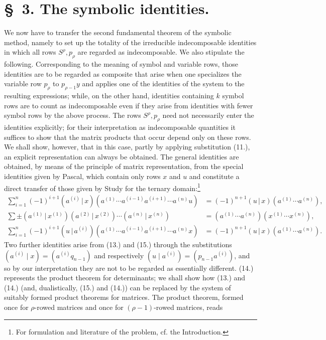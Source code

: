 \documentclass[11pt]{article}
\newcommand{\pair}[2]{(#1\,|\,#2)}
\begin{document}
\section*{\S\ 3. The symbolic identities.}
We now have to transfer the second fundamental theorem of the symbolic method, namely to set up the totality of the irreducible indecomposable identities in which all rows $S^\rho,p_\rho$ are regarded as indecomposable. We also stipulate the following. Corresponding to the meaning of symbol and variable rows, those identities are to be regarded as composite that arise when one specializes the variable row $p_\rho$ to $p_{\rho-1}y$ and applies one of the identities of the system to the resulting expressions; while, on the other hand, identities containing $k$ symbol rows are to count as indecomposable even if they arise from identities with fewer symbol rows by the above process. The rows $S^\rho,p_\rho$ need not necessarily enter the identities explicitly; for their interpretation as indecomposable quantities it suffices to show that the matrix products that occur depend only on these rows. We shall show, however, that in this case, partly by applying substitution (11.), an explicit representation can always be obtained. The general identities are obtained, by means of the principle of matrix representation, from the special identities given by Pascal, which contain only rows $x$ and $u$ and constitute a direct transfer of those given by Study for the ternary domain:\footnote{For formulation and literature of the problem, cf. the Introduction.}
\begin{align}
\sum_{i=1}^n(-1)^{i+1}\pair{a^{(i)}}{x}(a^{(1)}\cdots a^{(i-1)}a^{(i+1)}\cdots a^{(n)}u)&=(-1)^{n+1}\pair{u}{x}(a^{(1)}\cdots a^{(n)}),\tag{13}\\
\sum\pm\pair{a^{(1)}}{x^{(1)}}\pair{a^{(2)}}{x^{(2)}}\cdots\pair{a^{(n)}}{x^{(n)}}&=(a^{(1)}\cdots a^{(n)})(x^{(1)}\cdots x^{(n)}),\tag{14}\\
\sum_{i=1}^n(-1)^{i+1}\pair{u}{a^{(i)}}(a^{(1)}\cdots a^{(i-1)}a^{(i+1)}\cdots a^{(n)}x)&=(-1)^{n+1}\pair{u}{x}(a^{(1)}\cdots a^{(n)}).\tag{15}
\end{align}
Two further identities arise from (13.) and (15.) through the substitutions $(a^{(i)}\mid x)=(a^{(i)}q_{n-1})$ and respectively $(u\mid a^{(i)})=(p_{n-1}a^{(i)})$, and so by our interpretation they are not to be regarded as essentially different. (14.) represents the product theorem for determinants; we shall show how (13.) and (14.) (and, dualistically, (15.) and (14.)) can be replaced by the system of suitably formed product theorems for matrices. The product theorem, formed once for $\rho$-rowed matrices and once for $(\rho-1)$-rowed matrices, reads
\end{document}

